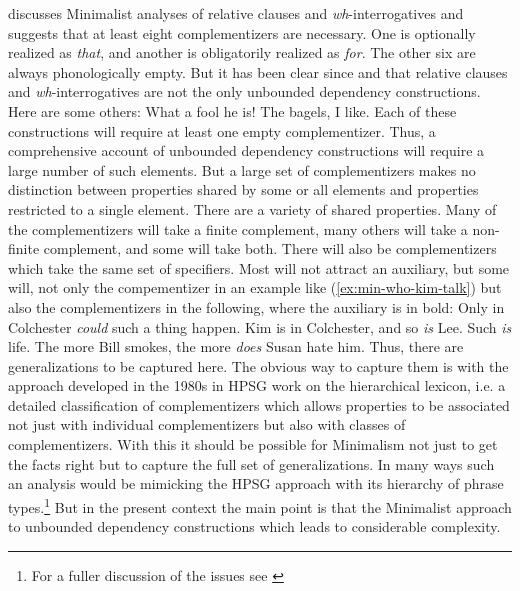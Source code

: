 \documentclass[output=paper]{langsci/langscibook}
\begin{document}
\citet{Borsley2006a,Borsley.2017} discusses Minimalist analyses of relative clauses and \textit{wh}-interrogatives and suggests that at least eight complementizers are necessary. One is optionally realized as \textit{that}, and another is obligatorily realized as \textit{for}. The other six are always phonologically empty. But it has been clear since \citet{Ross67} and \citet{Chomsky.1977} that relative clauses and \textit{wh}-interrogatives are not the only unbounded dependency constructions. Here are some others:
\eal
\ex What a fool he is! 
\ex The bagels, I like.	
\zl 
Each of these constructions will require at least one empty complementizer. Thus, a comprehensive account of unbounded dependency constructions will require a large number of such elements. But a large set of complementizers makes no distinction between properties shared by some or all elements and properties restricted to a single element. There are a variety of shared properties. Many of the complementizers will take a finite complement, many others will take a non-finite complement, and some will take both. There will also be complementizers which take the same set of specifiers. Most will not attract an auxiliary, but some will, not only the compementizer in an example like (\ref{ex:min-who-kim-talk}) but also the complementizers in the following, where the auxiliary is in bold:
\eal
\ex Only in Colchester \textit{could} such a thing happen.
\ex Kim is in Colchester, and so \textit{is} Lee.
\ex Such \textit{is} life.
\ex The more Bill smokes, the more \textit{does} Susan hate him.
\zl
Thus, there are generalizations to be captured here. The obvious way to capture them is with the approach developed in the 1980s in HPSG work on the hierarchical lexicon, i.e. a detailed classification of complementizers which allows properties to be associated not just with individual complementizers but also with classes of complementizers. With this it should be possible for Minimalism not just to get the facts right but to capture the full set of generalizations. In many ways such an analysis would be mimicking the HPSG approach with its hierarchy of phrase types.\footnote{%
For a fuller discussion of the issues see \citet{Borsley2006a,Borsley.2017}%
}	
But in the present context the main point is that the Minimalist approach to unbounded dependency constructions which leads to considerable complexity.
\end{document}

